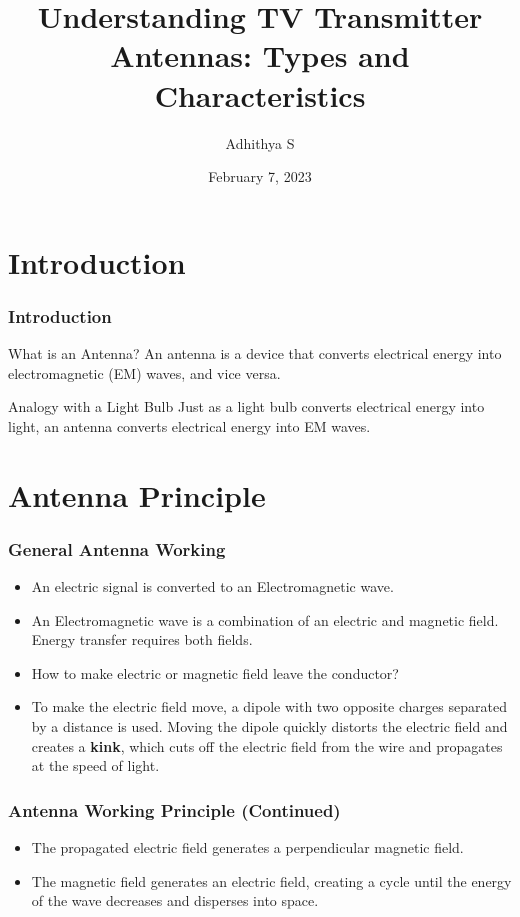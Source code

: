 \documentclass{beamer}
\title{Understanding \textbf{TV Transmitter Antennas}: Types and Characteristics}
\author{Adhithya S}
\date{February 7, 2023}
\begin{document}
\frame{\titlepage}

\section{Introduction}


\begin{frame}
  \frametitle{Introduction}
  \begin{block}{What is an Antenna?}
    An antenna is a device that converts electrical energy into electromagnetic (EM) waves, and vice versa.
  \end{block}
  \pause
  \begin{block}{Analogy with a Light Bulb}
    Just as a light bulb converts electrical energy into light, an antenna converts electrical energy into EM waves.
  \end{block}
\end{frame}

\section{Antenna Principle}

\begin{frame}
\frametitle{General Antenna Working}
\begin{itemize}
\item An electric signal is converted to an Electromagnetic wave.

\item An Electromagnetic wave is a combination of an electric and magnetic field. Energy transfer requires both fields.
\pause

\item How to make electric or magnetic field leave the conductor? 

\pause

\item To make the electric field move, a dipole with two opposite charges separated by a distance is used. Moving the dipole quickly distorts the electric field and creates a \textbf{kink}, which cuts off the electric field from the wire and propagates at the speed of light.
\end{itemize}
\end{frame}

\begin{frame}
\frametitle{Antenna Working Principle (Continued)}
    \begin{itemize}
        \item The propagated electric field generates a perpendicular magnetic field.
        
        \pause
        
        \item The magnetic field generates an electric field, creating a cycle until the energy of the wave decreases and disperses into space.
    \end{itemize}
\end{frame}
\end{document}
